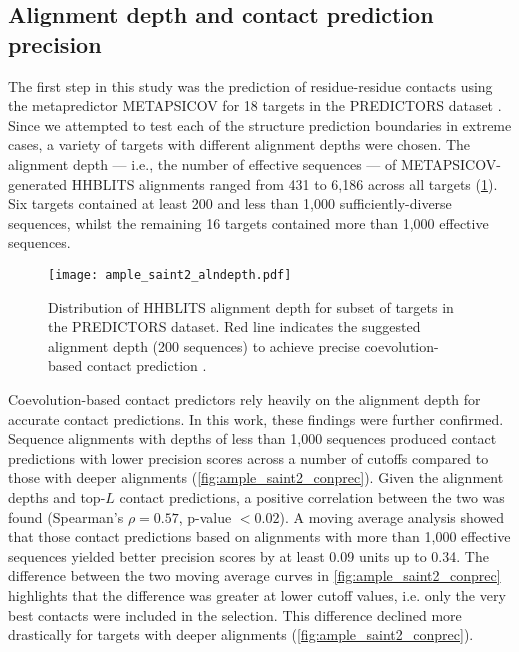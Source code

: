 \subsection{Alignment depth and contact prediction precision}
The first step in this study was the prediction of residue-residue contacts using the metapredictor METAPSICOV for 18 targets in the PREDICTORS dataset \cite{Jones2015-vq}. Since we attempted to test each of the structure prediction boundaries in extreme cases, a variety of targets with different alignment depths were chosen. The alignment depth --- i.e., the number of effective sequences --- of METAPSICOV-generated HHBLITS alignments ranged from 431 to 6,186 across all targets (\cref{fig:ample_saint2_alndepth}). Six targets contained at least 200 and less than 1,000 sufficiently-diverse sequences, whilst the remaining 16 targets contained more than 1,000 effective sequences.

\begin{figure}[H]
    \centering
    \texttt{[image: ample\_saint2\_alndepth.pdf]}
    \caption[Alignment depth for subsets of targets in the PREDICTORS dataset]{Distribution of HHBLITS alignment depth for subset of targets in the PREDICTORS dataset. Red line indicates the suggested alignment depth (200 sequences) to achieve precise coevolution-based contact prediction \cite{Simkovic2017-xs}.}
    \label{fig:ample_saint2_alndepth}
\end{figure}

Coevolution-based contact predictors rely heavily on the alignment depth for accurate contact predictions. In this work, these findings were further confirmed. Sequence alignments with depths of less than 1,000 sequences produced contact predictions with lower precision scores across a number of cutoffs compared to those with deeper alignments (\cref{fig:ample_saint2_conprec}). Given the alignment depths and top-$L$ contact predictions, a positive correlation between the two was found (Spearman's $\rho=0.57$, p-value $<0.02$). A moving average analysis showed that those contact predictions based on alignments with more than 1,000 effective sequences yielded better precision scores by at least 0.09 units up to 0.34. The difference between the two moving average curves in \cref{fig:ample_saint2_conprec} highlights that the difference was greater at lower cutoff values, i.e. only the very best contacts were included in the selection. This difference declined more drastically for targets with deeper alignments (\cref{fig:ample_saint2_conprec}).

